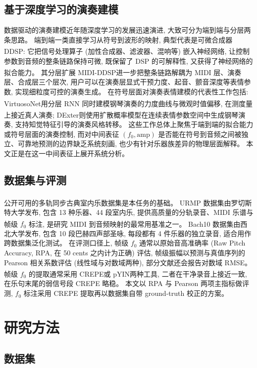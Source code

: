 \documentclass[a4paper, UTF8, zihao=-4, fontset=fandol]{ctexart}
\newcommand{\upcite}[1]{\textsuperscript{\cite{#1}}}
\begin{document}
\subsection{基于深度学习的演奏建模}

数据驱动的演奏建模近年随深度学习的发展迅速演进, 大致可分为端到端与分层两条思路。 端到端一类直接学习从符号到波形的映射, 典型代表是可微合成器 DDSP\upcite{ddsp}: 它把信号处理算子 (加性合成器、滤波器、混响等) 嵌入神经网络, 让控制参数到音频的整条链路保持可微, 既保留了 DSP 的可解释性, 又获得了神经网络的拟合能力。 其分层扩展 MIDI-DDSP\upcite{mididdsp}进一步把整条链路解耦为 MIDI 层、演奏层、合成层三个层次, 用户可以在演奏层显式干预力度、起音、颤音深度等表情参数, 实现细粒度可控的演奏生成。 在符号层面对演奏表情建模的代表性工作包括: VirtuosoNet\upcite{virtuosonet}用分层 RNN 同时建模钢琴演奏的力度曲线与微观时值偏移, 在测度量上接近真人演奏; DExter\upcite{dexter}则使用扩散概率模型在连续表情参数空间中生成钢琴演奏, 支持知觉特征引导的演奏风格转移。 这些工作总体上聚焦于端到端的拟合能力或符号层面的演奏控制, 而对中间表征 $(f_0, \mathrm{amp})$ 是否能在符号到音频之间被独立、可靠地预测的边界缺乏系统刻画, 也少有针对乐器族差异的物理层面解释。 本文正是在这一中间表征上展开系统分析。

\subsection{数据集与评测}

公开可用的多轨同步古典室内乐数据集是本任务的基础。 URMP 数据集\upcite{urmp}由罗切斯特大学发布, 包含 13 种乐器、44 段室内乐, 提供高质量的分轨录音、MIDI 乐谱与帧级 $f_0$ 标注, 是研究 MIDI 到音频映射的最常用基准之一。 Bach10 数据集\upcite{bach10}由西北大学发布, 包含 10 段巴赫四声部圣咏, 每段都有 4 件乐器的独立录音, 适合用作跨数据集泛化测试。 在评测口径上, 帧级 $f_0$ 通常以原始音高准确率 (Raw Pitch Accuracy, RPA, 在 50 cents 之内计为正确) 评估, 帧级振幅以预测与真值序列的 Pearson 相关系数评估 (线性域与对数域两种), 部分文献还会报告对数域 RMSE。 帧级 $f_0$ 的提取通常采用 CREPE\upcite{crepe}或 pYIN\upcite{mauchdixon}两种工具, 二者在干净录音上接近一致, 在乐句末尾的弱信号段 CREPE 略稳。 本文以 RPA 与 Pearson 两项主指标做评测, $f_0$ 标注采用 CREPE 提取再以数据集自带 ground-truth 校正的方案。

\section{研究方法}

\subsection{数据集}
\end{document}
